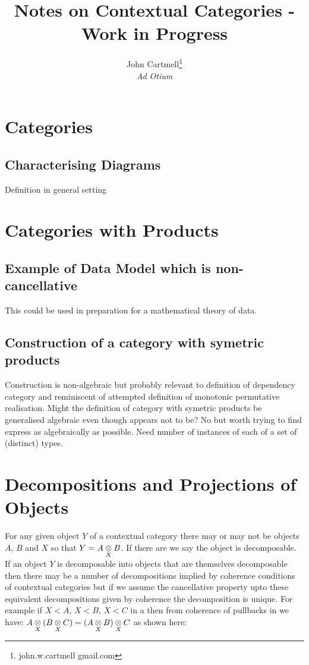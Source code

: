 \documentclass[10pt,a4paper]{scrartcl}
\title{Notes on Contextual Categories - Work in Progress}
\author{John Cartmell\footnote{john.w.cartmell gmail.com}\\ \normalsize{\textit{Ad Otium}}}
\begin{document}
\section{Categories}
\subsection{Characterising Diagrams}
Definition in general setting

\section{Categories with Products}

\subsection{Example of Data Model which is non-cancellative}
This could be used in preparation for a mathematical theory of data.
\subsection{Construction of a category with symetric products}
Construction is non-algebraic but probably relevant to definition of dependency category
and reminiscent of attempted definition of monotonic permutative realisation.
Might the definition of category with symetric products be generalised algebraic even though appears not to be? No but worth trying to find express as algebraically as possible. Need number of instances of each of a set of (distinct) types. 
\section{Decompositions and Projections of Objects}
For any given object $Y$ of a contextual category there may or may not be objects $A$, $B$ and $X$ so that
$Y = \crossx{A}{B}{X}$. If there are we say the object is decomposable. If an object $Y$ is decomposable into objects that
are themselves decomposable then there may be a number of decompositions implied by coherence conditions of contextual
categories but if we assume the cancellative property upto these equivalent decompositions given by coherence
the decomposition is unique. 
\noindent
For example if $X < A$, $X < B$, $X < C$ in a \ccat then from coherence of pullbacks in \ccat we have:
$\crossx{A}{(\crossx{B}{C}{X})}{X} = \crossx{(\crossx{A}{B}{X})}{C}{X}$ as shown here:
 
\end{document}
